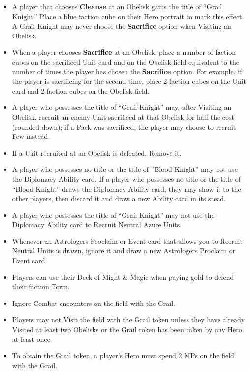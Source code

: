 \begin{multicols*}{2}
\begin{itemize}
  \item A player that chooses \textbf{Cleanse} at an Obelisk gains the title of ``\textcolor{darkcerulean}{Grail Knight}.'' Place a blue faction cube on their Hero portrait to mark this effect. A \textcolor{darkcerulean}{Grail Knight} may never choose the \textbf{Sacrifice} option when Visiting an Obelisk.
  \item When a player chooses \textbf{Sacrifice} at an Obelisk, place a number of faction cubes on the sacrificed Unit card and on the Obelisk field equivalent to the number of times the player has chosen the \textbf{Sacrifice} option. For example, if the player is sacrificing for the second time, place 2 faction cubes on the Unit card and 2 faction cubes on the Obelisk field.
  \item A player who possesses the title of ``\textcolor{darkcerulean}{Grail Knight}'' may, after Visiting an Obelisk, recruit an enemy Unit sacrificed at that Obelisk for half the cost (rounded down); if a Pack was sacrificed, the player may choose to recruit Few instead.
  \item If a Unit recruited at an Obelisk is defeated, Remove it.
  \item A player who possesses no title or the title of ``\textcolor{darkcandyapplered}{Blood Knight}'' may not use the Diplomacy Ability card. If a player who possesses no title or the title of ``\textcolor{darkcandyapplered}{Blood Knight}'' draws the Diplomacy Ability card, they may show it to the other players, then discard it and draw a new Ability card in its stead.
  \item A player who possesses the title of ``\textcolor{darkcerulean}{Grail Knight}'' may not use the Diplomacy Ability card to Recruit Neutral Azure Units.
  \item Whenever an Astrologers Proclaim or Event card that allows you to Recruit Neutral Units is drawn, ignore it and draw a new Astrologers Proclaim or Event card.
  \item Players can use their Deck of Might \& Magic when paying gold to defend their faction Town.
  \item Ignore Combat encounters on the field with the Grail.
  \item Players may not Visit the field with the Grail token unless they have already Visited at least two Obelisks or the Grail token has been taken by any Hero at least once.
  \item To obtain the Grail token, a player’s Hero must spend 2 MPs on the field with the Grail.

\end{itemize}
\end{multicols*}

